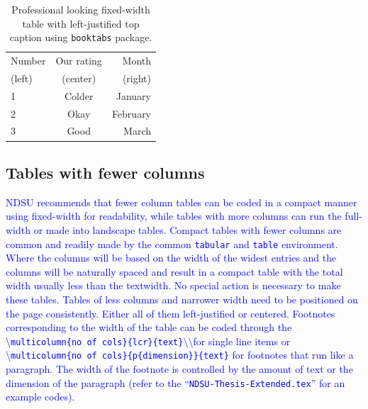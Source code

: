 \documentclass[phd,showgrids]{ndsu-thesis-2022}
\newcommand\italk[1]{\textcolor{blue}{#1}}  %
\newcommand\cmd[1]{\textbackslash\texttt{#1}}  %
\newcommand\tb{\textbackslash}
\begin{document}
\begin{table}[h!]
\centering
\caption{Professional looking fixed-width table with left-justified top caption using \texttt{booktabs} package.}
\begin{tabular}{ l c r }
\toprule
Number & Our rating & Month \\
(left) & (center)   & (right)\\
\midrule
1 & Colder & January \\
2 & Okay   & February \\
3 & Good   & March\\
\bottomrule
\end{tabular}
\label{tab22}
\end{table}

\kant[9]


\subsection{Tables with fewer columns}
\italk{NDSU recommends that fewer column tables can be coded in a compact manner using fixed-width for readability, while tables with more columns can run the full-width or made into landscape tables. Compact tables with fewer columns are common and readily made by the common \texttt{tabular} and \texttt{table} environment. Where the columns will be based on the width of the widest entries and the columns will be naturally spaced and result in a compact table with the total width usually less than the textwidth. No special action is necessary to make these tables. Tables of less columns and narrower width need to be positioned on the page consistently. Either all of them left-justified or centered. Footnotes corresponding to the width of the table can be coded through the \cmd{multicolumn\{no of cols\}\{lcr\}\{text\}}\tb\tb for single line items or \cmd{multicolumn\{no of cols\}\{p\{dimension\}\}\{text\}} for footnotes that run like a paragraph. The width of the footnote is controlled by the amount of text or the dimension of the paragraph (refer to the ``\texttt{NDSU-Thesis-Extended.tex}'' for an example codes).} 
 
\end{document}
